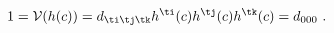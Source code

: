 \begin{equation}
1=\mathcal{V}(h(c))=d_{\ti\tj\tk}h^{\ti}(c)h^{\tj}(c)h^{\tk}(c)=d_{000} \ .
\end{equation}


